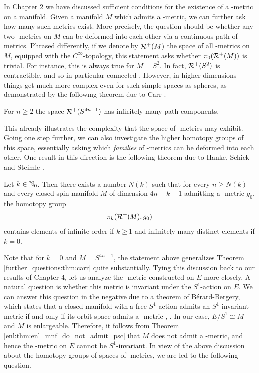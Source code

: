 In \hyperref[chapter:psc]{Chapter 2} we have discussed sufficient conditions for the existence of a \psc-metric on a manifold. Given a manifold $M$ which admits a \psc-metric, we can further ask how many such metrics exist. More precisely, the question should be whether any two \psc-metrics on $M$ can be deformed into each other via a continuous path of \psc-metrics. Phrased differently, if we denote by $\mathcal{R}^+(M)$ the space of all \psc-metrics on $M$, equipped with the $C^\infty$-topology, this statement asks whether $\pi_0(\mathcal{R}^+(M))$ is trivial. For instance, this is always true for $M = S^2$. In fact, $\mathcal{R}^+(S^2)$ is contractible, and so in particular connected \cite[Thm. 3.4]{stolz2014metrics}. However, in higher dimensions things get much more complex even for such simple spaces as spheres, as demonstrated by the following theorem due to Carr \cite[Thm. 4]{Carr1988}.

\begin{theorem}
	\label{further_questions:thm:carr}
	For $n \geq 2$ the space $\mathcal{R}^+(S^{4n-1})$ has infinitely many path components.
\end{theorem}

This already illustrates the complexity that the space of \psc-metrics may exhibit. Going one step further, we can also investigate the higher homotopy groups of this space, essentially asking which \emph{families} of \psc-metrics can be deformed into each other. One result in this direction is the following theorem due to Hanke, Schick and Steimle \cite[Thm. 1.1]{HankeSchickSteimle}.

\begin{theorem}
	Let $k \in \mathbb{N}_0$. Then there exists a number $N(k)$ such that for every $n \geq N(k)$ and every closed spin manifold $M$ of dimension $4n - k - 1$ admitting a \psc-metric $g_0$, the homotopy group 
	\[
	\pi_k(\mathcal{R}^+(M), g_0)
	\]
	contains elements of infinite order if $k \geq 1$ and infinitely many distinct elements if $k=0$.
\end{theorem}

Note that for $k=0$ and $M=S^{4n-1}$, the statement above generalizes Theorem \ref{further_questions:thm:carr} quite substantially. Tying this discussion back to our results of \hyperref[chapter:main_construction]{Chapter 4}, let us analyze the \psc-metric constructed on $E$ more closely. A natural question is whether this metric is invariant under the $S^1$-action on $E$. We can answer this question in the negative due to a theorem of Bérard-Bergery, which states that a closed manifold with a free $S^1$-action admits an $S^1$-invariant \psc-metric if and only if its orbit space admits a \psc-metric \cite[Thm. C]{BerardBergery1983}, \cite[Thm. 2.2]{Wiemeler2016}. In our case, $E / S^1 \cong M$ and $M$ is enlargeable. Therefore, it follows from Theorem \ref{enl:thm:enl_mnf_do_not_admit_psc} that $M$ does not admit a \psc-metric, and hence the \psc-metric on $E$ cannot be $S^1$-invariant. In view of the above discussion about the homotopy groups of spaces of \psc-metrics, we are led to the following question.

